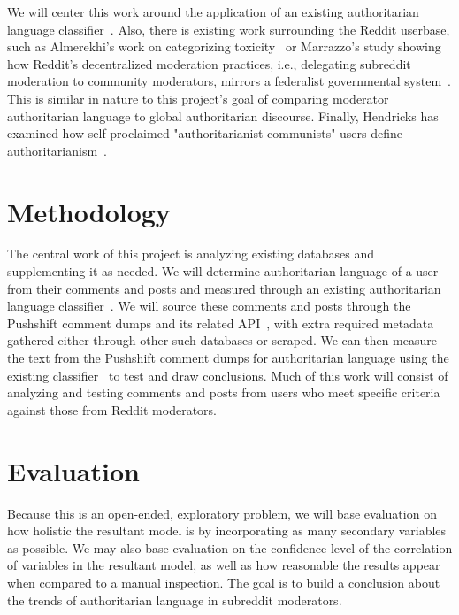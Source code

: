 \documentclass[letterpaper,twocolumn,10pt]{article}
\begin{document}
We will center this work around the application of an existing authoritarian language classifier~\cite{classifier}. Also, there is existing work surrounding the Reddit userbase, such as Almerekhi's work on categorizing toxicity~\cite{reddit-toxicity} or Marrazzo's study showing how Reddit's decentralized moderation practices, i.e., delegating subreddit moderation to community moderators, mirrors a federalist governmental system~\cite{federalist}. This is similar in nature to this project's goal of comparing moderator authoritarian language to global authoritarian discourse. Finally, Hendricks has examined how self-proclaimed "authoritarianist communists" users define authoritarianism~\cite{communists}.

\section{Methodology}


The central work of this project is analyzing existing databases and supplementing it as needed. We will determine authoritarian language of a user from their comments and posts and measured through an existing authoritarian language classifier~\cite{classifier}. We will source these comments and posts through the Pushshift comment dumps and its related API~\cite{pushshift, dump}, with extra required metadata gathered either through other such databases or scraped. We can then measure the text from the Pushshift comment dumps for authoritarian language using the existing classifier~\cite{classifier} to test and draw conclusions. Much of this work will consist of analyzing and testing comments and posts from users who meet specific criteria against those from Reddit moderators.

\section{Evaluation}

Because this is an open-ended, exploratory problem, we will base evaluation on how holistic the resultant model is by incorporating as many secondary variables as possible. We may also base evaluation on the confidence level of the correlation of variables in the resultant model, as well as how reasonable the results appear when compared to a manual inspection. The goal is to build a conclusion about the trends of authoritarian language in subreddit moderators.



\end{document}
